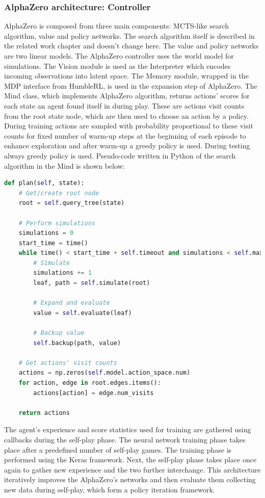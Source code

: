 \subsubsection{AlphaZero architecture: Controller}

AlphaZero is composed from three main components: MCTS-like search algorithm, value and policy networks. The search algorithm itself is described in the related work chapter and doesn't change here. The value and policy networks are two linear models. 
The AlphaZero controller uses the world model for simulations. The Vision module is used as the Interpreter which encodes incoming observations into latent space. The Memory module, wrapped in the MDP interface from HumbleRL, is used in the expansion step of AlphaZero. The Mind class, which implements AlphaZero algorithm, returns actions' scores for each state an agent found itself in during play. These are actions visit counts from the root state node, which are then used to choose an action by a policy. During training actions are sampled with probability proportional to these visit counts for fixed number of warm-up steps at the beginning of each episode to enhance exploration and after warm-up a greedy policy is used. During testing always greedy policy is used.
Pseudo-code written in Python of the search algorithm in the Mind is shown below:

\noindent\begin{minipage}{\textwidth}
\begin{lstlisting}[language=Python]
def plan(self, state):
    # Get/create root node
    root = self.query_tree(state)

    # Perform simulations
    simulations = 0
    start_time = time()
    while time() < start_time + self.timeout and simulations < self.max_simulations:
        # Simulate
        simulations += 1
        leaf, path = self.simulate(root)

        # Expand and evaluate
        value = self.evaluate(leaf)

        # Backup value
        self.backup(path, value)

    # Get actions' visit counts
    actions = np.zeros(self.model.action_space.num)
    for action, edge in root.edges.items():
        actions[action] = edge.num_visits

    return actions
\end{lstlisting}
\end{minipage}

The agent's experience and score statistics used for training are gathered using callbacks during the self-play phase. The neural network training phase takes place after a predefined number of self-play games. The training phase is performed using the Keras \cite{Code.Keras} framework. Next, the self-play phase takes place once again to gather new experience and the two further interchange. This architecture iteratively improves the AlphaZero's networks and then evaluate them collecting new data during self-play, which form a policy iteration framework.

